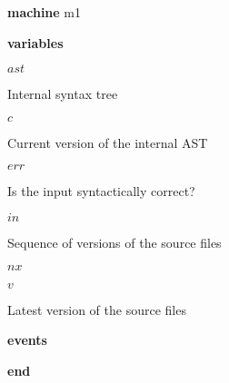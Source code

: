 \begin{block}
  \item   \textbf{machine} m1
  \item   \textbf{variables}
  \begin{block}
    \item   $ast$
    \item   \begin{block}
      \item    Internal syntax tree 
    \end{block}
    \item   $c$
    \item   \begin{block}
      \item   Current version of the internal AST
    \end{block}
    \item   $err$
    \item   \begin{block}
      \item    Is the input syntactically correct? 
    \end{block}
    \item   $in$
    \item   \begin{block}
      \item   Sequence of versions of the source files
    \end{block}
    \item   $nx$
    \item   $v$
    \item   \begin{block}
      \item   Latest version of the source files
    \end{block}
  \end{block}
  \item   
  \item   
  \item   \textbf{events}
  \begin{block}
    \item   
    \item   
    \item   
    \item   
  \end{block}
  \item   \textbf{end} \\
\end{block}
